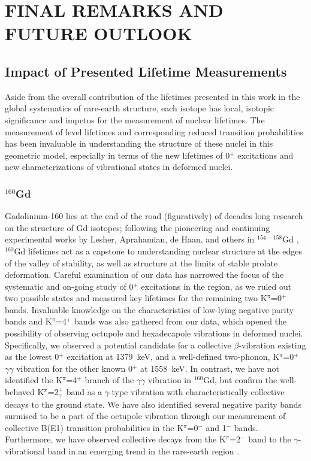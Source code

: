 %
%

\chapter{FINAL REMARKS AND FUTURE OUTLOOK}

\section{Impact of Presented Lifetime Measurements}
Aside from the overall contribution of the lifetimes presented in this work in the global systematics of rare-earth structure, each isotope has local, isotopic significance and impetus for the measurement of nuclear lifetimes. The measurement of level lifetimes and corresponding reduced transition probabilities has been invaluable in understanding the structure of these nuclei in this geometric model, especially in terms of the new lifetimes of 0$^+$ excitations and new characterizations of vibrational states in deformed nuclei. 
\subsection{$^{160}$Gd}
Gadolinium-160 lies at the end of the road (figuratively) of decades long research on the structure of Gd isotopes; following the pioneering and continuing experimental works by Lesher, Aprahamian, de Haan, and others in $^{154-158}$Gd \cite{Lesher_158Gdmain,Jentschel_156Gd_GRID,Meyer_pt0_2006}, $^{160}$Gd lifetimes act as a capstone to understanding nuclear structure at the edges of the valley of stability, as well as structure at the limits of stable prolate deformation. Careful examination of our data has narrowed the focus of the systematic and on-going study of 0$^+$ excitations in the region, as we ruled out two possible states and measured key lifetimes for the remaining two K$^\pi$=0$^+$ bands. Invaluable knowledge on the characteristics of low-lying negative parity bands and K$^\pi$=4$^+$ bands was also gathered from our data, which opened the possibility of observing octupole and hexadecapole vibrations in deformed nuclei. Specifically, we observed a potential candidate for a collective $\beta$-vibration existing as the lowest 0$^+$ excitation at 1379~keV, and a well-defined two-phonon, K$^\pi$=0$^+$ $\gamma\gamma$ vibration for the other known 0$^+$ at 1558~keV. In contrast, we have not identified the K$^\pi$=4$^+$ branch of the $\gamma\gamma$ vibration in $^{160}$Gd, but confirm the well-behaved K$^\pi$=2$^+_\gamma$ band as a $\gamma$-type vibration with characteristically collective decays to the ground state. We have also identified several negative parity bands surmised to be a part of the octupole vibration through our measurement of collective B(E1) transition probabilities in the K$^\pi$=0$^-$ and 1$^-$ bands. Furthermore, we have observed collective decays from the K$^\pi$=2$^-$ band to the $\gamma$-vibrational band in an emerging trend in the rare-earth region \cite{Pascu_octupole_2015}.
